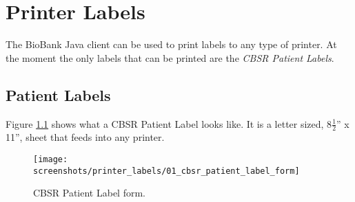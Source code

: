 \chapter{Printer Labels}
\label{chap:printer_labels}

The BioBank Java client can be used to print labels to any type of printer. At
the moment the only labels that can be printed are the \emph{CBSR Patient
  Labels}.

\section{Patient Labels}
\label{sec:printer_labels}

Figure \ref{fig:cbsr_patient_label} shows what a CBSR Patient Label looks
like. It is a letter sized, 8$\frac{1}{2}$'' x 11'', sheet that feeds into any
printer.

    \begin{figure}[H]
      \centering
      \scalebox{0.07}
      { \texttt{[image: screenshots/printer\_labels/01\_cbsr\_patient\_label\_form]} }
      \caption{CBSR Patient Label form.}
      \label{fig:cbsr_patient_label}
    \end{figure}
